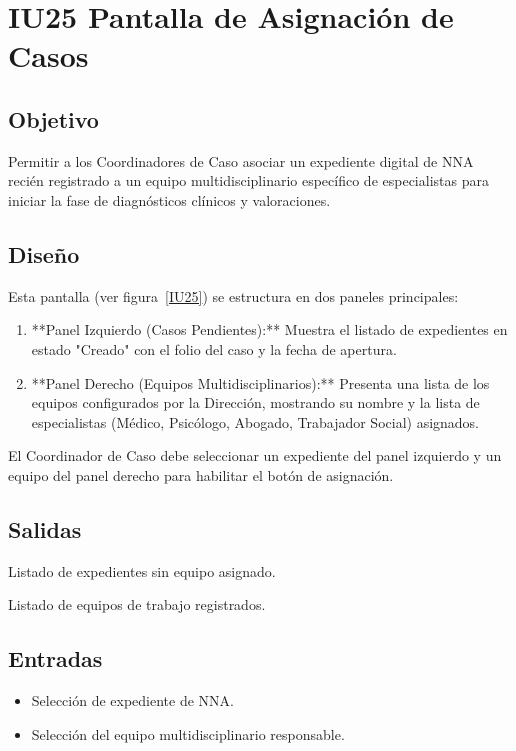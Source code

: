 \section{IU25 Pantalla de Asignación de Casos}

\subsection{Objetivo}
	Permitir a los Coordinadores de Caso asociar un expediente digital de NNA recién registrado a un equipo multidisciplinario específico de especialistas para iniciar la fase de diagnósticos clínicos y valoraciones.

\subsection{Diseño}
	Esta pantalla  (ver figura~\ref{IU25}) se estructura en dos paneles principales:
	\begin{enumerate}
		\item **Panel Izquierdo (Casos Pendientes):** Muestra el listado de expedientes en estado "Creado" con el folio del caso y la fecha de apertura.
		\item **Panel Derecho (Equipos Multidisciplinarios):** Presenta una lista de los equipos configurados por la Dirección, mostrando su nombre y la lista de especialistas (Médico, Psicólogo, Abogado, Trabajador Social) asignados.
	\end{enumerate}
	El Coordinador de Caso debe seleccionar un expediente del panel izquierdo y un equipo del panel derecho para habilitar el botón de asignación.


\subsection{Salidas}
	\begin{Citemize}
		\item Listado de expedientes sin equipo asignado.
		\item Listado de equipos de trabajo registrados.
	\end{Citemize}

\subsection{Entradas}
	\begin{itemize}
		\item Selección de expediente de NNA.
		\item Selección del equipo multidisciplinario responsable.
	\end{itemize}

